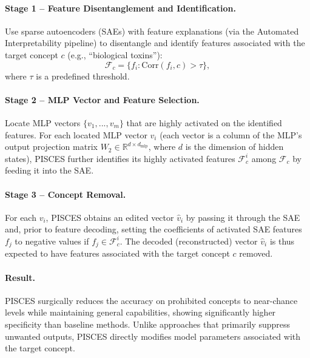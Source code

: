 \begin{definitionbox}
\paragraph{Stage 1 -- Feature Disentanglement and Identification.} Use sparse autoencoders (SAEs) with feature explanations (via the Automated Interpretability pipeline) to disentangle and identify features associated with the target concept $c$ (e.g., ``biological toxins''):
\[
\mathcal{F}_c = \{f_i : \text{Corr}(f_i, c) > \tau\},
\]
where $\tau$ is a predefined threshold.\\

\paragraph{Stage 2 -- MLP Vector and Feature Selection.} Locate MLP vectors $\{v_1, ..., v_m\}$ that are highly activated
on the identified features. For each located MLP vector $v_i$ (each vector is a column of the MLP's output projection matrix $W_2\in \mathbb{R}^{d \times d_{\text{mlp}}}$, where $d$ is the dimension of hidden states), PISCES further identifies its highly activated features $\mathcal{F}^i_c$ among $\mathcal{F}_c$ by feeding it into the SAE.\\

\paragraph{Stage 3 -- Concept Removal.} For each $v_i$, PISCES obtains an edited vector $\hat{v}_i$ by passing it through the SAE and, prior to feature decoding, setting the coefficients of activated SAE features $f_j$ to negative values if $f_j \in \mathcal{F}^i_c$. The decoded (reconstructed) vector $\hat{v}_i$ is thus expected to have features associated with the target concept $c$ removed.\\



\paragraph{Result.} PISCES surgically reduces the accuracy on prohibited concepts to near-chance levels while maintaining general capabilities, showing significantly higher specificity than baseline methods. Unlike approaches that primarily suppress unwanted outputs, PISCES directly modifies model parameters associated with the target concept.
\end{definitionbox}


